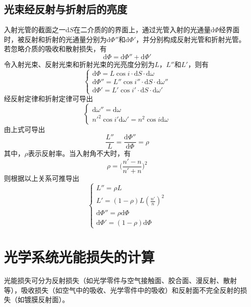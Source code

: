 \documentclass[cn,10pt,chinesefont=founder,math=newtx,cite=super,twoside]{elegantbook}
\begin{document}
\subsection{光束经反射与折射后的亮度}
入射光管的截面之一$\mathrm{d}S$在二介质的的界面上，通过光管入射的光通量$\mathrm{d}\varPhi$经界面时，被反射和折射的光通量分别为$\mathrm{d}\varPhi''$和$\mathrm{d}\varPhi'$，并分别构成反射光管和折射光管。若忽略介质的吸收和散射损失，有
\begin{equation}
\mathrm{d}\varPhi=\mathrm{d}\varPhi''+\mathrm{d}\varPhi'
\end{equation}
令入射光束、反射光束和折射光束的光亮度分别为$L$，$L''$和$L'$，则有
\begin{equation}
\begin{cases}
\mathrm{d}\varPhi=L\cos i\cdot\mathrm{d}S\cdot\mathrm{d}\omega\\
\mathrm{d}\varPhi''=L''\cos i''\cdot\mathrm{d}S\cdot\mathrm{d}\omega''\\
\mathrm{d}\varPhi'=L'\cos i'\cdot\mathrm{d}S\cdot\mathrm{d}\omega'
\end{cases}
\end{equation}
经反射定律和折射定律可导出
\begin{equation}
\begin{cases}
\mathrm{d}\omega''=\mathrm{d}\omega\\
n'^2\cos i'\mathrm{d}\omega'=n^2\cos i\mathrm{d}\omega 
\end{cases}
\end{equation}
由上式可导出
\begin{equation}
\frac{L''}{L}=\frac{\mathrm{d}\varPhi''}{\mathrm{d}\varPhi}=\rho
\end{equation}
其中，$\rho$表示反射率。当入射角不大时，有
\begin{equation}
\rho=\bigg(\frac{n'-n}{n'+n}\bigg)^2
\end{equation}
则根据以上关系可推导出
\begin{equation}
\begin{cases}
L''=\rho L\\
L'=(1-\rho)L(\frac{n'}{n})^2\\
\mathrm{d}\varPhi''=\rho\mathrm{d}\varPhi\\
\mathrm{d}\varPhi'=(1-\rho)\mathrm{d}\varPhi
\end{cases}
\end{equation}

\section{光学系统光能损失的计算}
光能损失可分为反射损失（如光学零件与空气接触面、胶合面、漫反射、散射等），吸收损失（如空气中的吸收、光学零件中的吸收）和反射面不完全反射的损失（如镀膜反射面）。
\end{document}
